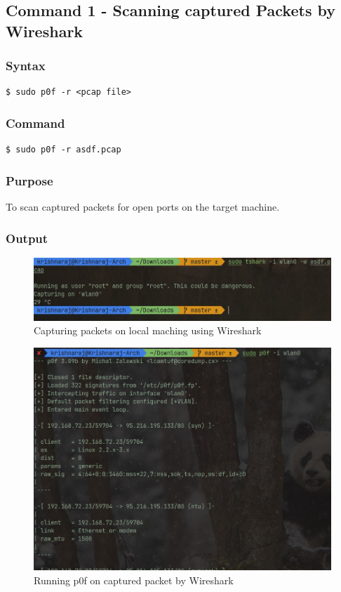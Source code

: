 \documentclass[11pt]{article}
\begin{document}
\subsection{Command 1 - Scanning captured Packets by Wireshark}

\subsubsection*{Syntax}
\begin{verbatim}
$ sudo p0f -r <pcap file>
\end{verbatim}

\subsubsection*{Command}
\begin{verbatim}
$ sudo p0f -r asdf.pcap
\end{verbatim}

\subsubsection*{Purpose}
To scan captured packets for open ports on the target machine.

\subsubsection*{Output}

\begin{figure}[H]
    \centering
    \includegraphics[width=1.00\textwidth]{p0f/capture packet with wireshark.jpg}
    \caption{Capturing packets on local maching using Wireshark}
\end{figure}

\begin{figure}[H]
    \centering
    \includegraphics[width=1.00\textwidth]{p0f/direct running p0f.jpg}
    \caption{Running p0f on captured packet by Wireshark}
\end{figure}
\end{document}
